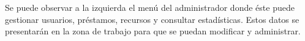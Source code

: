 Se puede observar a la izquierda el menú del administrador donde éste puede
gestionar usuarios, préstamos, recursos y consultar estadísticas.
Estos datos se presentarán en la zona de trabajo para que se puedan modificar y
administrar.
